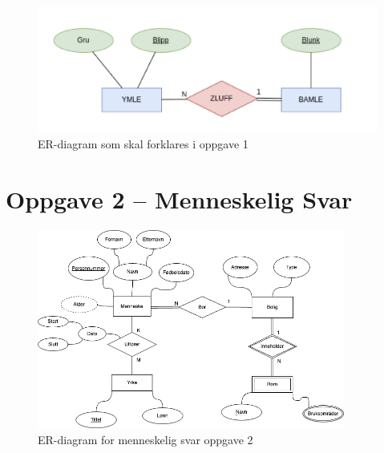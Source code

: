 \documentclass{article}
\begin{document}
\begin{figure}[h!]
    \centering
    \includegraphics[width=1\textwidth]{oppgave1} %
    \caption{ER-diagram som skal forklares i oppgave 1} %
    \label{fig:oppgave1} %
\end{figure}
\newpage
\section*{Oppgave 2 – Menneskelig Svar}
\begin{figure}[h!]
    \centering
    \includegraphics[width=0.9\textwidth]{oppgave2_oblig1.png} %
    \caption{ER-diagram for menneskelig svar oppgave 2} %
    \label{fig:oppgave2} %
\end{figure}
\end{document}
